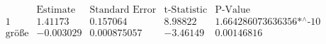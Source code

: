 \[\begin{array}{l|llll}
 \text{} & \text{Estimate} & \text{Standard Error} & \text{t-Statistic} & \text{P-Value} \\
\hline
 1 & 1.41173 & 0.157064 & 8.98822 & \text{1.664286073636356$\grave{ }$*${}^{\wedge}$-10} \\
 \text{gr{\" o}{\ss}e} & -0.003029 & 0.000875057 & -3.46149 & 0.00146816 \\
\end{array}\]

